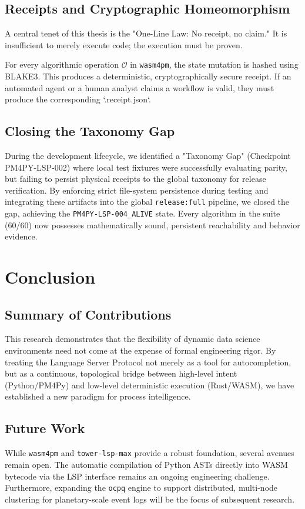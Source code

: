\documentclass[11pt,twoside,openright]{book}
\begin{document}
\section{Receipts and Cryptographic Homeomorphism}
A central tenet of this thesis is the "One-Line Law: No receipt, no claim." It is insufficient to merely execute code; the execution must be proven. 

For every algorithmic operation $\mathcal{O}$ in \texttt{wasm4pm}, the state mutation is hashed using BLAKE3. This produces a deterministic, cryptographically secure receipt. If an automated agent or a human analyst claims a workflow is valid, they must produce the corresponding `.receipt.json`.

\section{Closing the Taxonomy Gap}
During the development lifecycle, we identified a "Taxonomy Gap" (Checkpoint PM4PY-LSP-002) where local test fixtures were successfully evaluating parity, but failing to persist physical receipts to the global taxonomy for release verification. By enforcing strict file-system persistence during testing and integrating these artifacts into the global \texttt{release:full} pipeline, we closed the gap, achieving the \texttt{PM4PY-LSP-004\_ALIVE} state. Every algorithm in the suite (60/60) now possesses mathematically sound, persistent reachability and behavior evidence.

\chapter{Conclusion}
\section{Summary of Contributions}
This research demonstrates that the flexibility of dynamic data science environments need not come at the expense of formal engineering rigor. By treating the Language Server Protocol not merely as a tool for autocompletion, but as a continuous, topological bridge between high-level intent (Python/PM4Py) and low-level deterministic execution (Rust/WASM), we have established a new paradigm for process intelligence. 

\section{Future Work}
While \texttt{wasm4pm} and \texttt{tower-lsp-max} provide a robust foundation, several avenues remain open. The automatic compilation of Python ASTs directly into WASM bytecode via the LSP interface remains an ongoing engineering challenge. Furthermore, expanding the \texttt{ocpq} engine to support distributed, multi-node clustering for planetary-scale event logs will be the focus of subsequent research.
\end{document}
